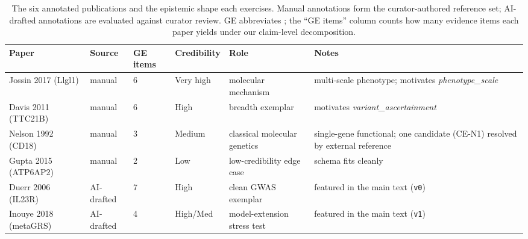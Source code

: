 
\begin{table}[H]
    \centering
    \caption[The six annotated publications]{The six annotated publications and the epistemic shape each
    exercises. Manual annotations form the curator-authored reference set; AI-drafted
    annotations are evaluated against curator review. GE abbreviates
    \GeneticEvidence{}; the ``GE items'' column counts how many evidence
    items each paper yields under our claim-level decomposition.}
    \label{tab:corpus}
    \small
    \begin{tabularx}{\linewidth}{@{}lllllX@{}}
\toprule
Paper & Source & GE items & Credibility & Role & Notes \\
\midrule
Jossin 2017 (Llgl1)   & manual       & 6 & Very high & molecular mechanism           & multi-scale phenotype; motivates \emph{phenotype\_scale} \\
Davis 2011 (TTC21B)   & manual       & 6 & High      & breadth exemplar              & motivates \emph{variant\_ascertainment} \\
Nelson 1992 (CD18)    & manual       & 3 & Medium    & classical molecular genetics  & single-gene functional; one candidate (CE-N1) resolved by external reference \\
Gupta 2015 (ATP6AP2)  & manual       & 2 & Low       & low-credibility edge case     & schema fits cleanly \\
Duerr 2006 (IL23R)    & AI-drafted   & 7 & High      & clean GWAS exemplar           & featured in the main text (\texttt{v0}) \\
Inouye 2018 (metaGRS) & AI-drafted   & 4 & High/Med  & model-extension stress test   & featured in the main text (\texttt{v1}) \\
\bottomrule
    \end{tabularx}
\end{table}


